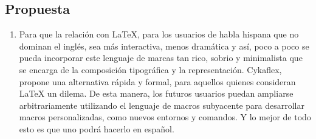 \documentclass[12pt]{article}
\newcommand{\sectionbreak}{\clearpage}
\begin{document}
\subsection{Propuesta}
\indent 
\begin{enumerate}
    \item Para que la relación con LaTeX, para los usuarios de habla hispana que no dominan el inglés, sea más interactiva, menos dramática y así, poco a poco se pueda incorporar este lenguaje de marcas tan rico, sobrio y minimalista que se encarga de la composición tipográfica y la representación. Cykaflex, propone una alternativa rápida y formal, para aquellos quienes consideran LaTeX un dilema. De esta manera, los futuros usuarios puedan ampliarse arbitrariamente utilizando el lenguaje de macros subyacente para desarrollar macros personalizadas, como nuevos entornos y comandos. Y lo mejor de todo esto es que uno podrá hacerlo en español.
\end{enumerate}
\sectionbreak
\end{document}
